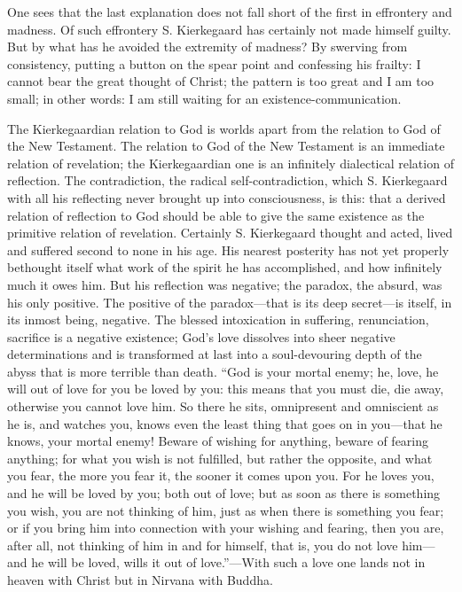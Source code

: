 \documentclass[12pt,a4paper,openany]{book}
\newcommand{\opage}[1]{\marginnote{\footnotesize\textit{[#1]}}}
\begin{document}
One sees that the last explanation does not fall short of the first in
effrontery and madness. Of such effrontery S. Kierkegaard has certainly
not made himself guilty. But by what has he avoided the extremity of
madness? By swerving from consistency, putting a button on the spear
point and confessing his frailty: I cannot bear the great thought of
Christ; the pattern is too great and I am too small; in other words: I am
still waiting for an existence-communication.

The Kierkegaardian relation to God is worlds apart from the relation to
God of the New Testament. The relation to God of the New Testament is an
immediate relation of revelation; the Kierkegaardian one is an infinitely
dialectical relation of reflection. The contradiction, the radical
self-contradiction, which S. Kierkegaard with all his reflecting never
brought up into consciousness, is this: that a derived relation of
reflection to God should be able to give the same existence as the
primitive relation of revelation. Certainly S. Kierkegaard thought and
acted, lived and suffered second to none in his age. His nearest posterity
has not yet properly bethought itself what work of the spirit he has
accomplished, and how infinitely much it owes him. But his reflection was
negative; the paradox, the absurd, was his only positive. The positive of
the paradox---that is its deep secret---is itself, in its inmost being,
negative. The blessed intoxication in \opage{77}suffering, renunciation, sacrifice
is a negative existence; God's love dissolves into sheer negative
determinations and is transformed at last into a soul-devouring depth of
the abyss that is more terrible than death. ``God is your mortal enemy;
he, love, he will out of love for you be loved by you: this means that
you must die, die away, otherwise you cannot love him. So there he sits,
omnipresent and omniscient as he is, and watches you, knows even the least
thing that goes on in you---that he knows, your mortal enemy! Beware of
wishing for anything, beware of fearing anything; for what you wish is
not fulfilled, but rather the opposite, and what you fear, the more you
fear it, the sooner it comes upon you. For he loves you, and he will be
loved by you; both out of love; but as soon as there is something you
wish, you are not thinking of him, just as when there is something you
fear; or if you bring him into connection with your wishing and fearing,
then you are, after all, not thinking of him in and for himself, that
is, you do not love him---and he will be loved, wills it out of
love.''---With such a love one lands not in heaven with Christ but in
Nirvana with Buddha.
\end{document}
